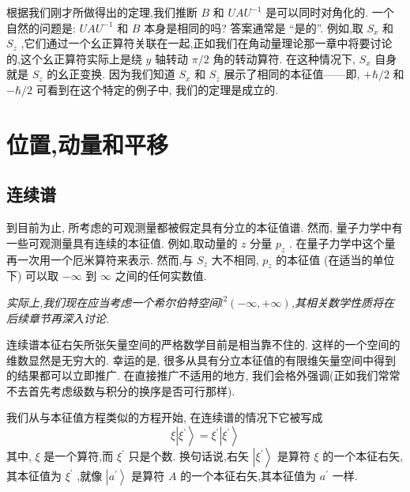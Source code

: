 \documentclass[lang=cn,newtx,10pt,scheme=chinese,thmcnt=section]{elegantbook}
\begin{document}
根据我们刚才所做得出的定理,我们推断 $B$ 和 ${UA}{U}^{-1}$ 是可以同时对角化的. 一个自然的问题是: ${UA}{U}^{-1}$ 和 $B$ 本身是相同的吗? 答案通常是 “是的”. 例如,取 ${S}_{x}$ 和 ${S}_{z}$ ,它们通过一个幺正算符关联在一起,正如我们在角动量理论那一章中将要讨论的,这个幺正算符实际上是绕 $y$ 轴转动 $\pi /2$ 角的转动算符. 在这种情况下, ${S}_{x}$ 自身就是 ${S}_{z}$ 的幺正变换. 因为我们知道 ${S}_{x}$ 和 ${S}_{z}$ 展示了相同的本征值——即, $+ \hbar /2$ 和 $- \hbar /2$ 可看到在这个特定的例子中, 我们的定理是成立的.
\section{位置,动量和平移}
\subsection*{连续谱}
到目前为止, 所考虑的可观测量都被假定具有分立的本征值谱. 然而, 量子力学中有一些可观测量具有连续的本征值. 例如,取动量的 $z$ 分量 ${p}_{z}$ . 在量子力学中这个量再一次用一个厄米算符来表示. 然而,与 ${S}_{z}$ 大不相同, ${p}_{z}$ 的本征值 (在适当的单位下) 可以取 $- \infty$ 到 $\infty$ 之间的任何实数值.

\begin{remark}
\textit{	实际上,我们现在应当考虑一个希尔伯特空间$l^2(-\infty,+\infty)$,其相关数学性质将在后续章节再深入讨论.}
\end{remark}

连续谱本征右矢所张矢量空间的严格数学目前是相当靠不住的. 这样的一个空间的维数显然是无穷大的. 幸运的是, 很多从具有分立本征值的有限维矢量空间中得到的结果都可以立即推广. 在直接推广不适用的地方, 我们会格外强调(正如我们常常不去首先考虑级数与积分的换序是否可行那样).

我们从与本征值方程类似的方程开始, 在连续谱的情况下它被写成
\begin{equation}
	\xi \left| {\xi }^{\prime }\right\rangle = {\xi }^{\prime }\left| {\xi }^{\prime }\right\rangle
\end{equation}
其中, $\xi$ 是一个算符,而 ${\xi }^{\prime }$ 只是个数. 换句话说,右矢 $\left| {\xi }^{\prime }\right\rangle$ 是算符 $\xi$ 的一个本征右矢,其本征值为 ${\xi }^{\prime }$ ,就像 $\left| {a}^{\prime }\right\rangle$ 是算符 $A$ 的一个本征右矢,其本征值为 ${a}^{\prime }$ 一样.
\end{document}
